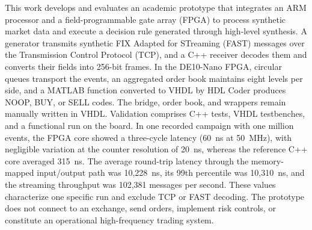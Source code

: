 
\begin{abstractutfpr}
This work develops and evaluates an academic prototype that integrates an ARM processor and a field-programmable gate array (FPGA) to process synthetic market data and execute a decision rule generated through high-level synthesis. A generator transmits synthetic FIX Adapted for STreaming (FAST) messages over the Transmission Control Protocol (TCP), and a C++ receiver decodes them and converts their fields into 256-bit frames. In the DE10-Nano FPGA, circular queues transport the events, an aggregated order book maintains eight levels per side, and a MATLAB function converted to VHDL by HDL Coder produces NOOP, BUY, or SELL codes. The bridge, order book, and wrappers remain manually written in VHDL. Validation comprises C++ tests, VHDL testbenches, and a functional run on the board. In one recorded campaign with one million events, the FPGA core showed a three-cycle latency (60~ns at 50~MHz), with negligible variation at the counter resolution of 20~ns, whereas the reference C++ core averaged 315~ns. The average round-trip latency through the memory-mapped input/output path was 10,228~ns, its 99th percentile was 10,310~ns, and the streaming throughput was 102,381 messages per second. These values characterize one specific run and exclude TCP or FAST decoding. The prototype does not connect to an exchange, send orders, implement risk controls, or constitute an operational high-frequency trading system.
\end{abstractutfpr}
